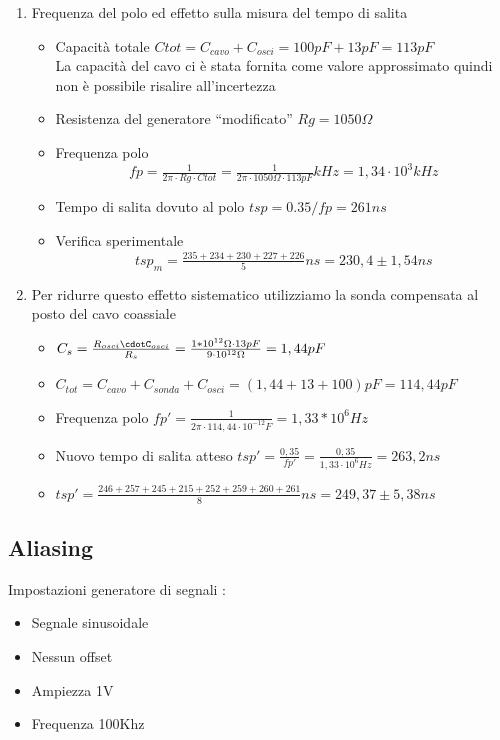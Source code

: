 \documentclass[a4paper]{article}
\begin{document}
\begin{enumerate}
\item Frequenza del polo ed effetto sulla misura del tempo di salita
  \begin{itemize}
    \item Capacità totale \(Ctot = C_{cavo} + C_{osci} = 100 pF + 13 pF = 113 pF\) \\ La capacità del cavo ci è stata fornita come valore approssimato quindi non è possibile risalire all'incertezza
    \item Resistenza del generatore ``modificato'' \(Rg= 1050 \Omega\)
    \item Frequenza polo \[fp = \tfrac{1}{2\pi \cdot Rg \cdot Ctot} = \tfrac{1}{2\pi \cdot 1050\Omega \cdot 113pF}kHz = 1,34\cdot10^3 kHz \]
    \item Tempo di salita dovuto al polo \(tsp= 0.35/fp = 261 ns\)
    \item Verifica sperimentale \[tsp_m = \tfrac{235+234+230+227+226}{5} ns = 230,4 \pm 1,54 ns\]
    \end{itemize}

\item Per ridurre questo effetto sistematico utilizziamo la sonda compensata al posto del cavo coassiale
 \begin{itemize}
 \item  \(C_s=\tfrac{R_{osci}\cdotC_{osci}}{R_s}= \tfrac{1*10^{12}\Omega\cdot13 pF}{9\cdot10^{12}\Omega} = 1,44 pF\)
 \item \(C_{tot}= C_{cavo}+C_{sonda}+C_{osci} = (1,44 +13 +100)pF = 114,44 pF\)
 \item Frequenza polo \(fp' = \tfrac{1}{2\pi\cdot114,44\cdot10^{-12}F} = 1,33 * 10^6 Hz\)
 \item Nuovo tempo di salita atteso \(tsp'= \tfrac{0,35}{fp'} = \tfrac{0,35}{1,33\cdot10^6 Hz}= 263,2 ns\)
 \item \(tsp'= \tfrac{246+257+245+215+252+259+260+261}{8}ns = 249,37 \pm 5,38 ns\)
 \end{itemize}
\end{enumerate}



\begin{tcolorbox}[breakable,colback=cyan,colframe=cyan]
\section*{Aliasing}
\end{tcolorbox}

Impostazioni generatore di segnali :
\begin{itemize}
\item Segnale sinusoidale
\item Nessun offset
\item Ampiezza 1V
\item Frequenza 100Khz
\end{itemize}
\end{document}
